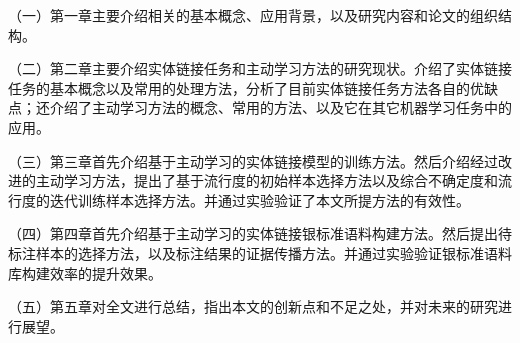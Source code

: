 （一）第一章主要介绍相关的基本概念、应用背景，以及研究内容和论文的组织结构。

（二）第二章主要介绍实体链接任务和主动学习方法的研究现状。介绍了实体链接任务的基本概念以及常用的处理方法，分析了目前实体链接任务方法各自的优缺点；还介绍了主动学习方法的概念、常用的方法、以及它在其它机器学习任务中的应用。

（三）第三章首先介绍基于主动学习的实体链接模型的训练方法。然后介绍经过改进的主动学习方法，提出了基于流行度的初始样本选择方法以及综合不确定度和流行度的迭代训练样本选择方法。并通过实验验证了本文所提方法的有效性。

（四）第四章首先介绍基于主动学习的实体链接银标准语料构建方法。然后提出待标注样本的选择方法，以及标注结果的证据传播方法。并通过实验验证银标准语料库构建效率的提升效果。

（五）第五章对全文进行总结，指出本文的创新点和不足之处，并对未来的研究进行展望。